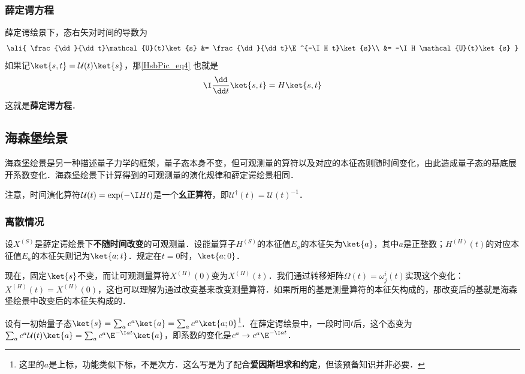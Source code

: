 \subsubsection{薛定谔方程}

薛定谔绘景下，态右矢对时间的导数为
\begin{equation}\label{HsbPic_eq4}
\ali{
    \frac{\dd}{\dd t}\mathcal{U}(t)\ket{s} &= \frac{\dd}{\dd t}\E^{-\I H t}\ket{s}\\
    &= -\I H \mathcal{U}(t)\ket{s}
}
\end{equation}
如果记$\ket{s, t}=\mathcal{U}(t)\ket{s}$，那\autoref{HsbPic_eq4} 也就是
\begin{equation}\label{HsbPic_eq5}
\I \frac{\dd}{\dd t}\ket{s, t} = H\ket{s, t}
\end{equation}
这就是\textbf{薛定谔方程}．








\subsection{海森堡绘景}

海森堡绘景是另一种描述量子力学的框架，量子态本身不变，但可观测量的算符以及对应的本征态则随时间变化，由此造成量子态的基底展开系数变化．海森堡绘景下计算得到的可观测量的演化规律和薛定谔绘景相同．

注意，时间演化算符$\mathcal{U}(t)=\exp(-\I Ht)$是一个\textbf{幺正算符}，即$\mathcal{U}^\dagger(t)=\mathcal{U}(t)^{-1}$．

\subsubsection{离散情况}



设$X^{(S)}$是薛定谔绘景下\textbf{不随时间改变}的可观测量．设能量算子$H^{(S)}$的本征值$E_a$的本征矢为$\ket{a}$，其中$a$是正整数；$H^{(H)}(t)$的对应本征值$E_a$的本征矢则记为$\ket{a; t}$．规定在$t=0$时，$\ket{a; 0}$．

现在，固定$\ket{s}$不变，而让可观测量算符$X^{(H)}(0)$变为$X^{(H)}(t)$．我们通过转移矩阵$\Omega(t)=\omega^i_j(t)$实现这个变化：$X^{(H)}(t)=X^{(H)}(0)$，这也可以理解为通过改变基来改变测量算符．如果所用的基是测量算符的本征矢构成的，那改变后的基就是海森堡绘景中改变后的本征矢构成的．

设有一初始量子态$\ket{s}=\sum_a c^a\ket{a}=\sum_a c^a\ket{a; 0}$\footnote{这里的$a$是上标，功能类似下标，不是次方．这么写是为了配合\textbf{爱因斯坦求和约定}，但该预备知识并非必要．}．在薛定谔绘景中，一段时间$t$后，这个态变为$\sum_a c^a\mathcal{U}(t)\ket{a}=\sum_ac^a\E^{-\I at}\ket{a}$，即系数的变化是$c^a\to c^a\E^{-\I at}$．

